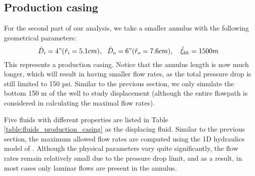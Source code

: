 \documentclass[review]{elsarticle}
\begin{document}
\subsection{Production casing}
For the second part of our analysis, we take a smaller annulus with the following geometrical parameters:
%
\begin{equation}\label{eq:well_production}
	 \hat D_{i} = 4" (\hat r_i = 5.1 cm), ~~\hat D_{o} = 6" (\hat r_o = 7.6 cm), ~~~ \hat \xi_{bh} = 1500m 
\end{equation}
%
This represents a production casing. Notice that the annulus length is now much longer, which will result in having smaller flow rates, as the total pressure drop is still limited to 150 psi. Similar to the previous section, we only simulate the bottom 150 m of the well to study displacement (although the entire flowpath is considered in calculating the maximal flow rates).  

Five fluids with different properties are listed in Table \ref{table:fluids_production_casing} as the displacing fluid. Similar to the previous section, the maximum allowed flow rates are computed using the 1D hydraulics model of \cite{Maleki2016}. Although the physical parameters vary quite significantly, the flow rates remain relatively small due to the pressure drop limit, and as a result, in most cases only laminar flows are present in the annulus. 
\end{document}
